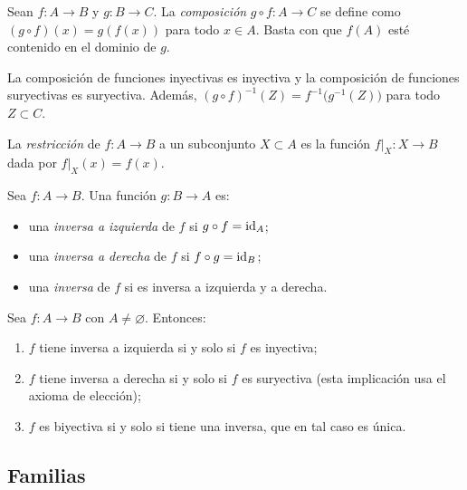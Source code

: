 Sean \(f\colon A \to B\) y \(g\colon B \to C\). La \emph{composición} \(g \circ f\colon A \to C\) se define como \((g \circ f)(x) = g(f(x))\) para todo \(x \in A\). Basta con que \(f(A)\) esté contenido en el dominio de \(g\).

\begin{prop}
  La composición de funciones inyectivas es inyectiva y la composición de funciones suryectivas es suryectiva. Además, \({(g \circ f)}^{-1}(Z) = f^{-1}\bigl(g^{-1}(Z)\bigr)\) para todo \(Z \subset C\).
\end{prop}

\begin{definition}[Restricción]
  La \emph{restricción} de \(f\colon A \to B\) a un subconjunto \(X \subset A\) es la función \(f|_X\colon X \to B\) dada por \(f|_X(x) = f(x)\).
\end{definition}

\begin{definition}
  Sea \(f\colon A \to B\). Una función \(g\colon B \to A\) es:
  \begin{itemize}
    \item una \emph{inversa a izquierda} de \(f\) si \(g \circ f = \operatorname{id}_A\);
    \item una \emph{inversa a derecha} de \(f\) si \(f \circ g = \operatorname{id}_B\);
    \item una \emph{inversa} de \(f\) si es inversa a izquierda y a derecha.
  \end{itemize}
\end{definition}

\begin{prop}
  Sea \(f\colon A \to B\) con \(A \neq \varnothing\). Entonces:
  \begin{enumerate}[label=(\arabic*)]
    \item \(f\) tiene inversa a izquierda si y solo si \(f\) es inyectiva;
    \item \(f\) tiene inversa a derecha si y solo si \(f\) es suryectiva (esta implicación usa el axioma de elección);
    \item \(f\) es biyectiva si y solo si tiene una inversa, que en tal caso es única.
  \end{enumerate}
\end{prop}

\subsection{Familias}

